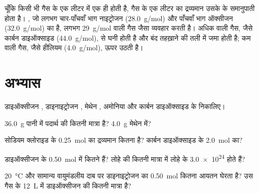 \begin{remark}[भारी और हल्की गैसें]\label{rem:g10:the-mole:heavy}
चूँकि किसी भी गैस के एक लीटर में  एक ही होती है, गैस के एक लीटर
का द्रव्यमान उसके  के समानुपाती होता है। , जो लगभग चार-पाँचवाँ
भाग नाइट्रोजन (\qty{28.0}{g/mol}) और पाँचवाँ भाग ऑक्सीजन
(\qty{32.0}{g/mol}) का  है, लगभग
\qty{29}{g/mol}  वाली गैस जैसा व्यवहार करती है। अधिक 
वाली गैस, जैसे कार्बन डाइऑक्साइड
(\qty{44.0}{g/mol}),  से घनी होती है और बंद तहख़ाने की तली में जमा होती
है; कम  वाली गैस, जैसे हीलियम
(\qty{4.0}{g/mol}), ऊपर उठती है।
\end{remark}

\section{अभ्यास}

\begin{exercise}[$\star$]\label{exo:g10:the-mole:1}
डाइऑक्सीजन , डाइनाइट्रोजन , मेथेन , अमोनिया  और
कार्बन डाइऑक्साइड  के  निकालिए।
\end{exercise}

\begin{exercise}[$\star$]\label{exo:g10:the-mole:2}
\qty{36.0}{g} पानी में पदार्थ की कितनी मात्रा है? \qty{4.0}{g} मेथेन
में?
\end{exercise}

\begin{exercise}[$\star$]\label{exo:g10:the-mole:3}
सोडियम क्लोराइड  के \qty{0.25}{mol} का द्रव्यमान कितना है?
कार्बन डाइऑक्साइड के \qty{2.0}{mol} का?
\end{exercise}

\begin{exercise}[$\star$]\label{exo:g10:the-mole:4}
डाइऑक्सीजन के \qty{0.50}{mol} में कितने  हैं? लोहे की कितनी मात्रा में
लोहे के \num{3.0e24}  होते हैं?
\end{exercise}

\begin{exercise}[$\star$]\label{exo:g10:the-mole:5}
\qty{20}{\celsius} और सामान्य वायुमंडलीय दाब पर डाइनाइट्रोजन का \qty{0.50}{mol}
कितना आयतन घेरता है? उस गैस के \qty{12}{L} में डाइऑक्सीजन की कितनी मात्रा
है?
\end{exercise}

